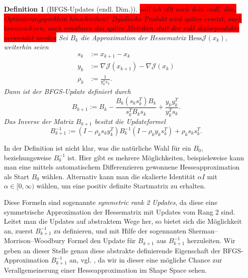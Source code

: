 \documentclass[bibliography=totoc,12pt,a4paper]{scrartcl}
\theoremstyle{exampstyle}
\newtheorem{defi}{Definition}%
\numberwithin{equation}{section}
\begin{document}
\begin{defi}[BFGS-Updates (endl. Dim.)]\label{BFGS-updates}
	\colorbox{red}{soll ich vllt noch dein endl. dim. Optimierungsproblem hinschreiben? Dyadische Produkt wird später ersetzt, auch kennzeichnen, auch erwähnen das später Metriken statt der eukl skalarprodukte verwendet werden}	
	Sei $B_k$ die Approximation der Hessematrix $\text{Hess}\mathcal{J}(x_k)$, weiterhin seien 
	\begin{align*}
		s_k &:= x_{k+1} - x_k \\ y_k &:= \nabla \mathcal{J}(x_{k+1}) - \nabla \mathcal{J}(x_k) \\ \rho_k &:= \frac{1}{y_k^T s_k }.
	\end{align*}
	Dann ist der \textit{BFGS-Update} definiert durch
	\begin{equation}
		B_{k+1} := B_k - \frac{B_k (s_k s_k^T) B_k}{s_k^T B_k s_k} + \frac{y_k y_k^T}{y_k^T s_k}.
	\end{equation}
	Das Inverse der Matrix $B_{k+1}$ besitzt die Updateformel
	\begin{equation}
		B_{k+1}^{-1} := (I - \rho_k s_k y_k^T)B_k^{-1}(I - \rho_k y_k s_k^T) + \rho_k s_k s_k^T.
	\end{equation}
\end{defi}
In der Definition ist nicht klar, was die natürliche Wahl für ein $B_0$, beziehungsweise $B_0^{-1}$ ist. Hier gibt es mehrere Möglichkeiten, beispielsweise kann man eine mittels automatischem Differenzieren gewonnene Hesseapproximation als Start $B_0$ wählen. Alternativ kann man die skalierte Identität $\alpha I$ mit $\alpha \in [0,\infty)$ wählen, um eine positiv definite Startmatrix zu erhalten.

Diese Formeln sind sogenannte \textit{symmetric rank 2 Updates}, da diese eine symmetrische Approximation der Hessematrix mit Updates vom Rang 2 sind. Leitet man die Updates auf abstraktem Wege her, so bietet sich die Möglichkeit an, zuerst $B_{k+1}^{-1}$ zu definieren, und mit Hilfe der sogennanten Sherman–
Morrison–Woodbury Formel den Update für $B_{k+1}$ aus $B_{k+1}^{-1}$ herzuleiten. Wir geben an dieser Stelle genau diese abstrakte definierende Eigenschaft der BFGS-Approximation $B_{k+1}^{-1}$ an, vgl. \cite{Nocedal}, da wir in dieser eine mögliche Chance zur Verallgemeinerung einer Hesseapproximation im Shape Space sehen.
\end{document}
